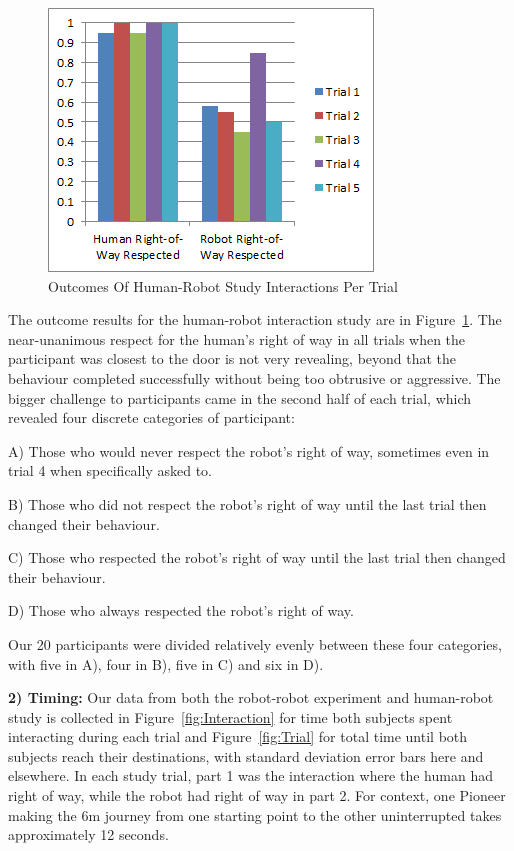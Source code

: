 \documentclass[letterpaper, 10 pt, conference]{ieeeconf}  %
\begin{document}
     \begin{figure}
      \centering
      \includegraphics{outcomes.png}
      \caption{Outcomes Of Human-Robot Study Interactions Per Trial}
      \label{fig:Outcomes}
   \end{figure}

The outcome results for the human-robot interaction study are in Figure~\ref{fig:Outcomes}. The near-unanimous respect for the human's right of way in all trials when the participant was closest to the door is not very revealing, beyond that the behaviour completed successfully without being too obtrusive or aggressive. The bigger challenge to participants came in the second half of each trial, which revealed four discrete categories of participant: 

A) Those who would never respect the robot's right of way, sometimes even in trial 4 when specifically asked to. 

B) Those who did not respect the robot's right of way until the last trial then changed their behaviour. 

C) Those who respected the robot's right of way until the last trial then changed their behaviour. 

D) Those who always respected the robot's right of way. 

Our 20 participants were divided relatively evenly between these four categories, with five in A), four in B), five in C) and six in D).
 
\textbf{2) Timing:} Our data from both the robot-robot experiment and human-robot study is collected in Figure~\ref{fig:Interaction} for time both subjects spent interacting during each trial and Figure~\ref{fig:Trial} for total time until both subjects reach their destinations, with standard deviation error bars here and elsewhere. In each study trial, part 1 was the interaction where the human had right of way, while the robot had right of way in part 2. For context, one Pioneer making the 6m journey from one starting point to the other uninterrupted takes approximately 12 seconds.   
 
\end{document}
